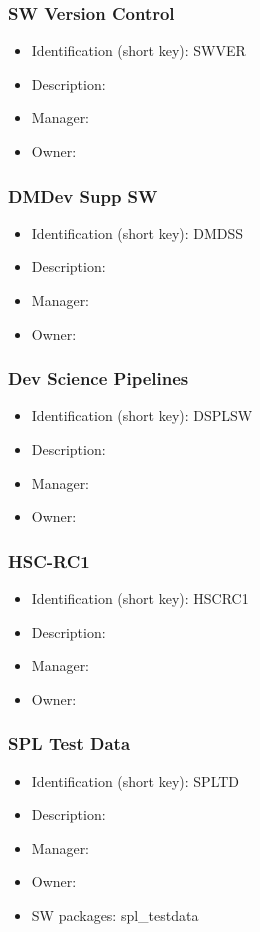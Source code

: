 \subsubsection{SW Version Control}\label{sect:SWVER}
\begin{itemize}
\item Identification (short key): SWVER
\item Description: 
\item Manager: 
\item Owner: 
\end{itemize}

\subsubsection{DMDev Supp SW}\label{sect:DMDSS}
\begin{itemize}
\item Identification (short key): DMDSS
\item Description: 
\item Manager: 
\item Owner: 
\end{itemize}

\subsubsection{Dev Science Pipelines}\label{sect:DSPLSW}
\begin{itemize}
\item Identification (short key): DSPLSW
\item Description: 
\item Manager: 
\item Owner: 
\end{itemize}

\subsubsection{HSC-RC1}\label{sect:HSCRC1}
\begin{itemize}
\item Identification (short key): HSCRC1
\item Description: 
\item Manager: 
\item Owner: 
\end{itemize}

\subsubsection{SPL Test Data}\label{sect:SPLTD}
\begin{itemize}
\item Identification (short key): SPLTD
\item Description: 
\item Manager: 
\item Owner: 
\item SW packages: spl\_testdata
\end{itemize}

